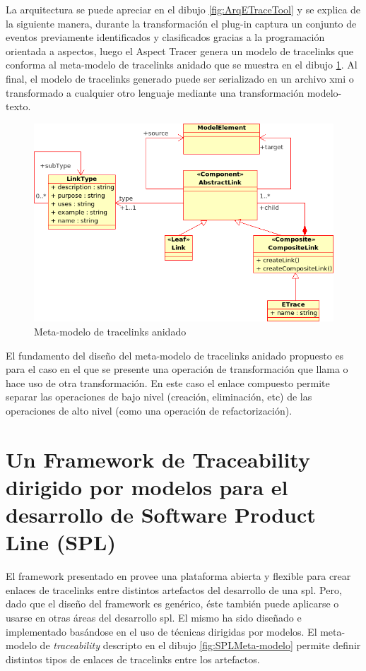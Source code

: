 \documentclass[a4paper,12pt,oneside,spanish]{book}
\begin{document}
La arquitectura se puede apreciar en el dibujo \ref{fig:ArqETraceTool} y se explica de la siguiente manera, durante la transformación el plug-in captura un conjunto de eventos previamente identificados y clasificados gracias a la programación orientada a aspectos, luego el Aspect Tracer genera un modelo de tracelinks que conforma al meta-modelo de tracelinks anidado que se muestra en el dibujo \ref{fig:ETraceToolMeta-modelo}. Al final, el modelo de tracelinks generado puede ser serializado en un archivo \gls{xmi} o transformado a cualquier otro lenguaje mediante una transformación modelo-texto.

\begin{figure}[hbtp]
\centering
\includegraphics[scale=0.6]{./img/NestedTraceMetamodel}
\caption{Meta-modelo de tracelinks anidado}
\label{fig:ETraceToolMeta-modelo}
\end{figure}

El fundamento del diseño del meta-modelo de tracelinks anidado propuesto es para el caso en el que se presente una operación de transformación que llama o hace uso de otra transformación. En este caso el enlace compuesto permite separar las operaciones de bajo nivel (creación, eliminación, etc) de las operaciones de alto nivel (como una operación de refactorización).

\section{Un Framework de Traceability dirigido por modelos para el desarrollo de Software Product Line (SPL)}

El framework presentado en \cite{SousaKuleszaRummlerAnquetilMitschkeMoreiraAmaralAraujo} provee una plataforma abierta y flexible para crear enlaces de tracelinks entre distintos artefactos del desarrollo de una \gls{spl}. Pero, dado que el diseño del framework es genérico, éste también puede aplicarse o usarse en otras áreas del desarrollo \gls{spl}. El mismo ha sido diseñado e implementado basándose en el uso de técnicas dirigidas por modelos. El meta-modelo de \textit{traceability} descripto en el dibujo \ref{fig:SPLMeta-modelo} permite definir distintos tipos de enlaces de tracelinks entre los artefactos.
\end{document}
